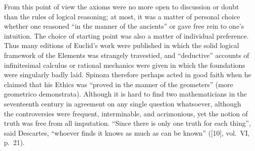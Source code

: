 From this point of view the axioms were no more open to discussion or doubt than the rules of logical reasoning; at most, it was a matter of personal choice whether one reasoned ``in the manner of the ancients'' or gave free rein to one's intuition. The choice of starting point was also a matter of individual preference. Thus many editions of Euclid's work were published in which the solid logical framework of the Elements was strangely travestied, and ``deductive'' accounts of infinitesimal calculus or rational mechanics were given in which the foundations were singularly badly laid. Spinoza therefore perhaps acted in good faith when he claimed that his Ethics was ``proved in the manner of the geometers'' (more geometrico demonstrata). Although it is hard to find two mathematicians in the seventeenth century in agreement on any single question whatsoever, although the controversies were frequent, interminable, and acrimonious, yet the notion of truth was free from all imputation. ``Since there is only one truth for each thing'', said Descartes, ``whoever finds it knows as much as can be known'' ({[}10{]}, vol.~VI, p.~21).

